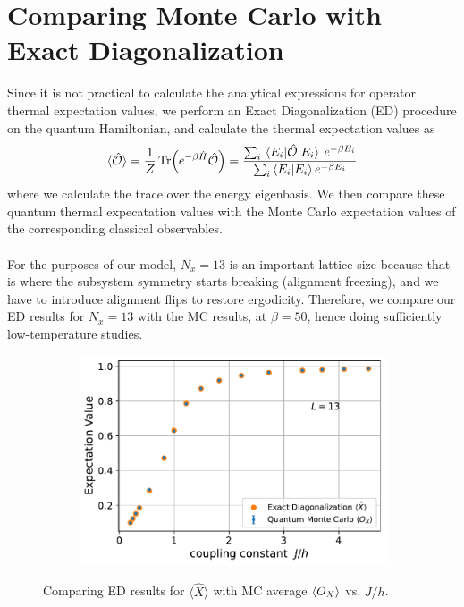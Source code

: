 \documentclass[../thesis_main.tex]{subfiles}
\begin{document}
\section{Comparing Monte Carlo with Exact Diagonalization}
Since it is not practical to calculate the analytical expressions for operator thermal expectation values, we perform an Exact Diagonalization (ED) procedure on the quantum Hamiltonian, and calculate the thermal expectation values as 
\begin{equation*}
    \langle \hat{\mathcal{O}} \rangle =  \frac{1}{Z} \Tr(e^{-\beta \hat{H}} \hat{\mathcal{O}}) = \frac{\sum_{i} \mel{E_i}{\hat{\mathcal{O}}}{E_i} \: e^{-\beta E_i}}{\sum_i \braket{E_i}{E_i} e^{-\beta E_i}}
\end{equation*}
where we calculate the trace over the energy eigenbasis. We then compare these quantum thermal expecatation values with the Monte Carlo expectation values of the corresponding classical observables.~\\~\\
For the purposes of our model, $N_x = 13$ is an important lattice size because that is where the subsystem symmetry starts breaking (alignment freezing), and we have to introduce alignment flips to restore ergodicity. Therefore, we compare our ED results for $N_x = 13$ with the MC results, at $\beta =50$, hence doing sufficiently low-temperature studies.

\begin{figure}[!htb]
    \centering
    \begin{subfigure}[b]{0.6\textwidth}
        \centering
        \includegraphics[width=\textwidth]{images/13_site/L=13_X.pdf}
    \end{subfigure}
    \caption{Comparing ED results for $\langle \hat{X} \rangle$ with MC average $\expval{O_X}$ vs. $J/h$.}
    \label{expvalX_ED_vs_MC_13}
\end{figure}
\end{document}
